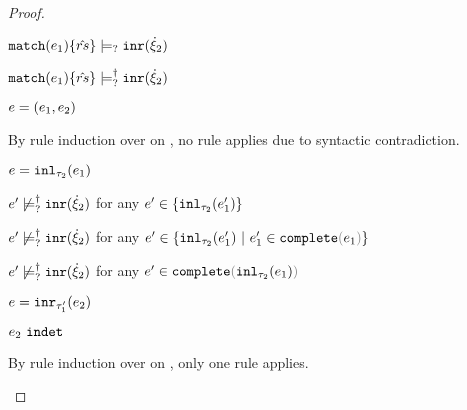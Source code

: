 \begin{proof}
\begin{byCases}
\begin{byCases}
\begin{pfsteps*}
        \item $\mathtt{match}(e_1) \{\hat{rs}\} \models_{?} \mathtt{inr}(\dot{\xi}_2)$  
        \item $\mathtt{match}(e_1) \{\hat{rs}\} \models_{?}^{\dag} \mathtt{inr}(\dot{\xi}_2)$ 
        \end{pfsteps*} 
        \item[\text{(\ref{rule:IPairL}), (\ref{rule:IPairR}), (\ref{rule:IPair})}] 
        \begin{pfsteps*}
        \item $e=(e_1 , e_2)$ 
        \end{pfsteps*} 
        By rule induction over  on , no rule applies due to syntactic contradiction.
        \item[\text{(\ref{rule:IInl})}] 
        \begin{pfsteps*}
        \item $e=\mathtt{inl}_{\tau_2}({e_1})$ 
        \item $e' \not\models_{?}^{\dag} \mathtt{inr}(\dot{\xi}_2)$ for any $e' \in \{\mathtt{inl}_{\tau_2}({e_1'})\}$  
        \item $e' \not\models_{?}^{\dag} \mathtt{inr}(\dot{\xi}_2)$ for any $e' \in \{\hinl{\tau_2}{e_1'} ~\vert~ e_1' \in \expcomplete{e_1}\}$  
        \item $e' \not\models_{?}^{\dag} \mathtt{inr}(\dot{\xi}_2)$ for any $e' \in \expcomplete{\hinl{\tau_2}{e_1}}$ 
        \end{pfsteps*} 
        \item[\text{(\ref{rule:IInr})}] 
        \begin{pfsteps*}
        \item $e=\mathtt{inr}_{\tau_1'}({e_2})$ 
        \item $e_2 ~\mathtt{indet}$  
        \end{pfsteps*} 
        By rule induction over  on , only one rule applies.
        \begin{byCases}
          \item[\text{(\ref{rule:TInr})}]

\end{byCases}
\end{byCases}
\end{byCases}
\end{proof}
